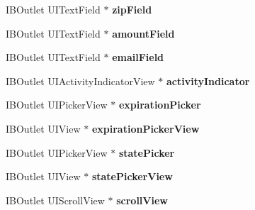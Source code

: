 \begin{DoxyCompactItemize}
\item 
\hypertarget{interface_purchase_view_controller_a4cebdc3abff26e67b496a8c799a4a492}{
IBOutlet UITextField $\ast$ {\bfseries zipField}}
\label{interface_purchase_view_controller_a4cebdc3abff26e67b496a8c799a4a492}

\item 
\hypertarget{interface_purchase_view_controller_ab96d833002ae035988431a4ee03ac795}{
IBOutlet UITextField $\ast$ {\bfseries amountField}}
\label{interface_purchase_view_controller_ab96d833002ae035988431a4ee03ac795}

\item 
\hypertarget{interface_purchase_view_controller_a1be62b83ae0df63ea68309849e4a13d5}{
IBOutlet UITextField $\ast$ {\bfseries emailField}}
\label{interface_purchase_view_controller_a1be62b83ae0df63ea68309849e4a13d5}

\item 
\hypertarget{interface_purchase_view_controller_a23a9502bf4df13fec3cd649b151e4d69}{
IBOutlet UIActivityIndicatorView $\ast$ {\bfseries activityIndicator}}
\label{interface_purchase_view_controller_a23a9502bf4df13fec3cd649b151e4d69}

\item 
\hypertarget{interface_purchase_view_controller_abce9582b24a2776815a2ee41f8e8093b}{
IBOutlet UIPickerView $\ast$ {\bfseries expirationPicker}}
\label{interface_purchase_view_controller_abce9582b24a2776815a2ee41f8e8093b}

\item 
\hypertarget{interface_purchase_view_controller_a2c0d64134fe960515dd5c68b49020769}{
IBOutlet UIView $\ast$ {\bfseries expirationPickerView}}
\label{interface_purchase_view_controller_a2c0d64134fe960515dd5c68b49020769}

\item 
\hypertarget{interface_purchase_view_controller_ad183a351315674690191228ee790d06f}{
IBOutlet UIPickerView $\ast$ {\bfseries statePicker}}
\label{interface_purchase_view_controller_ad183a351315674690191228ee790d06f}

\item 
\hypertarget{interface_purchase_view_controller_abef03556a799941318d0605262c059b1}{
IBOutlet UIView $\ast$ {\bfseries statePickerView}}
\label{interface_purchase_view_controller_abef03556a799941318d0605262c059b1}

\item 
\hypertarget{interface_purchase_view_controller_a651c0165149dbdadd4fe96a2211e987d}{
IBOutlet UIScrollView $\ast$ {\bfseries scrollView}}
\label{interface_purchase_view_controller_a651c0165149dbdadd4fe96a2211e987d}


\end{DoxyCompactItemize}
